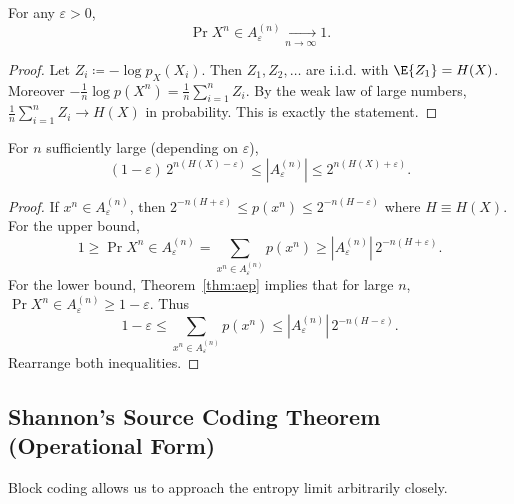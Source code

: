 \begin{theorem}
\label{thm:aep}
For any $\varepsilon>0$,
\begin{equation}
    \Pr{X^n\in A_\varepsilon^{(n)}} \xrightarrow[n\to\infty]{} 1.
\end{equation}
\end{theorem}

\begin{proof}
Let $Z_i\coloneqq -\log p_X(X_i)$.
Then $Z_1,Z_2,\dots$ are i.i.d. with $\E{Z_1}=H(X)$.
Moreover
\(-\frac{1}{n}\log p(X^n)=\frac{1}{n}\sum_{i=1}^n Z_i\).
By the weak law of large numbers, $\frac{1}{n}\sum_{i=1}^n Z_i\to H(X)$ in probability.
This is exactly the statement.
\end{proof}

\begin{theorem}
\label{thm:typical-set-size}
For $n$ sufficiently large (depending on $\varepsilon$),
\begin{equation}
    (1-\varepsilon)\,2^{n(H(X)-\varepsilon)}
    \le |A_\varepsilon^{(n)}|
    \le 2^{n(H(X)+\varepsilon)}.
\end{equation}
\end{theorem}

\begin{proof}
If $x^n\in A_\varepsilon^{(n)}$, then
\(2^{-n(H+\varepsilon)}\le p(x^n)\le 2^{-n(H-\varepsilon)}\) where $H\equiv H(X)$.
For the upper bound,
\[
1\ge \Pr{X^n\in A_\varepsilon^{(n)}}=\sum_{x^n\in A_\varepsilon^{(n)}} p(x^n)
\ge |A_\varepsilon^{(n)}|\,2^{-n(H+\varepsilon)}.
\]
For the lower bound, Theorem~\ref{thm:aep} implies that for large $n$,
$\Pr{X^n\in A_\varepsilon^{(n)}}\ge 1-\varepsilon$.
Thus
\[
1-\varepsilon
\le \sum_{x^n\in A_\varepsilon^{(n)}} p(x^n)
\le |A_\varepsilon^{(n)}|\,2^{-n(H-\varepsilon)}.
\]
Rearrange both inequalities.
\end{proof}

\subsection{Shannon's Source Coding Theorem (Operational Form)}
\label{sec:shannon-source-coding}


Block coding allows us to approach the entropy limit arbitrarily closely.

